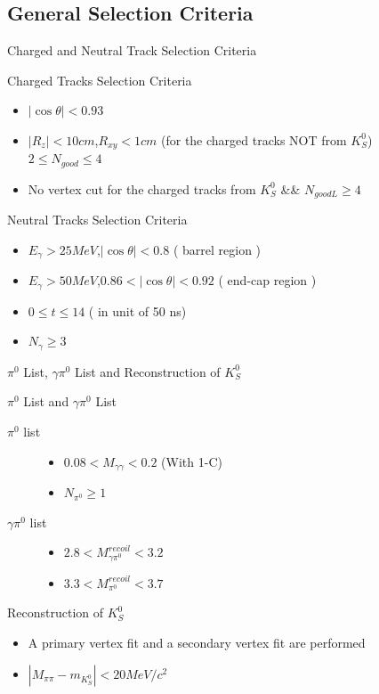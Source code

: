 \documentclass{beamer}
\begin{document}
\subsection{General Selection Criteria}
\begin{frame}{Charged and Neutral Track Selection Criteria}
\begin{block}{Charged Tracks Selection Criteria}
\begin{itemize}
\item $ | \cos\theta |<0.93$
\item $|R_{z}|<10cm$,$R_{xy}<1cm$ (for the charged tracks NOT from $K^0_S$)\\ $2\le N_{good}\le 4$
\item No vertex cut for the charged tracks from $K^0_S$ \&\& $N_{goodL}\ge 4$
\end{itemize}
\end{block}
\begin{block}{Neutral Tracks Selection Criteria}
\begin{itemize}
\item $E_{\gamma}>25 MeV$,$|\cos\theta|<0.8$ ( barrel region )
\item $E_{\gamma}>50 MeV$,$0.86<|\cos\theta|<0.92$ ( end-cap region )
\item $0\le t\le 14$ ( in unit of 50 ns)
\item $N_{\gamma}\ge3$
\end{itemize}
\end{block}
\end{frame}
\begin{frame}{$\pi^0$ List, $\gamma\pi^0$ List and Reconstruction of $K^0_S$}
\begin{block}{$\pi^0$ List and $\gamma \pi^0$ List}
\begin{description}
\item[$\pi^0$ list]
\begin{itemize}
\item $0.08<M_{\gamma\gamma}<0.2$ (With 1-C)
\item $N_{\pi^0}\ge 1$
\end{itemize}
\bigskip
\item[$\gamma\pi^0$ list]
\begin{itemize}
\item $2.8<M^{recoil}_{\gamma\pi^0}<3.2$
\item $3.3<M^{recoil}_{\pi^0}<3.7$
\end{itemize}
\end{description}
\end{block}
\begin{block}{Reconstruction of $K^0_S$}
\begin{itemize}
\item A primary vertex fit and a secondary vertex fit are performed
\item $ |M_{\pi \pi} - m_{K_S^0} | < 20 MeV/c^2$
\end{itemize}
\end{block}
\end{frame}
\end{document}
